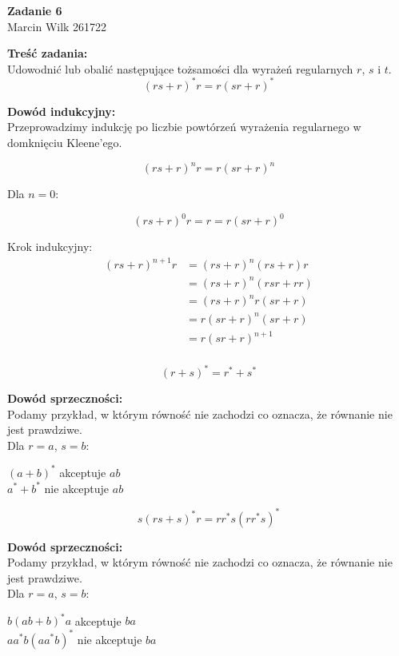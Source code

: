 \documentclass{article}
\begin{document}
\begin{center}
    \textbf{\LARGE Zadanie 6} \\
    {\large Marcin Wilk 261722} \\
\end{center}

\noindent \textbf{Treść zadania:} \\
Udowodnić lub obalić następujące tożsamości dla wyrażeń regularnych $r$, $s$ i $t$. \\

\[(rs + r)^*r = r(sr + r)^*\]

\noindent \textbf{Dowód indukcyjny:} \\
Przeprowadzimy indukcję po liczbie powtórzeń wyrażenia regularnego w domknięciu Kleene'ego.

\[(rs + r)^nr = r(sr + r)^n\]

\noindent Dla $n = 0$:

\[(rs + r)^0r = r = r(sr + r)^0\]

\noindent Krok indukcyjny:
\begin{align*}
    (rs + r)^{n+1}r & = (rs + r)^n(rs + r)r \\
    & = (rs + r)^n(rsr + rr) \\
    & = (rs + r)^nr(sr + r) \\
    & = r(sr + r)^n(sr + r) \\
    & = r(sr + r)^{n + 1} \\
\end{align*}

\[(r + s)^* = r^* + s^*\]

\noindent \textbf{Dowód sprzeczności:} \\
Podamy przykład, w którym równość nie zachodzi co oznacza, że równanie nie jest prawdziwe. \\

\noindent Dla $r = a$, $s = b$:

\begin{center}
    $(a + b)^*$ akceptuje $ab$ \\[\baselineskip]
    $a^* + b^*$ nie akceptuje $ab$ \\[2\baselineskip]
\end{center}

\[s(rs + s)^*r = rr^*s(rr^*s)^*\]

\noindent \textbf{Dowód sprzeczności:} \\
Podamy przykład, w którym równość nie zachodzi co oznacza, że równanie nie jest prawdziwe. \\

\noindent Dla $r = a$, $s = b$:

\begin{center}
    $b(ab + b)^*a$ akceptuje $ba$ \\[\baselineskip]
    $aa^*b(aa^*b)^*$ nie akceptuje $ba$
\end{center}
\end{document}
